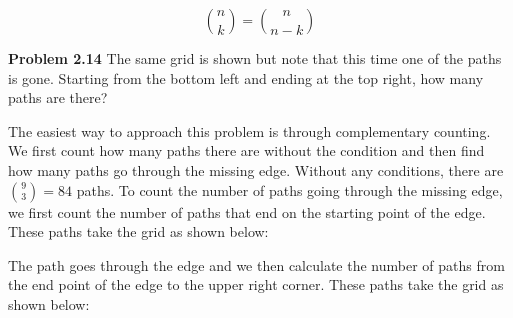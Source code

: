\documentclass[11pt]{scrartcl}
\begin{document}
$${n \choose k}={n \choose {n-k}}$$
\begin{tcolorbox}
\textbf{Problem 2.14} The same grid is shown but note that this time one of the paths is gone. Starting from the bottom left and ending at the top right, how many paths are there?
\vspace*{+0.25cm}

\centering 
{}
\end{tcolorbox}
\noindent 
The easiest way to approach this problem is through complementary counting. We first count how many paths there are without the condition and then find how many paths go through the missing edge. Without any conditions, there are ${9 \choose 3}=84$ paths. To count the number of paths going through the missing edge, we first count the number of paths that end on the starting point of the edge. These paths take the grid as shown below:
\vspace*{+0.25cm}

\begin{center}
{}
\end{center}
\noindent
The path goes through the edge and we then calculate the number of paths from the end point of the edge to the upper right corner. These paths take the grid as shown below: 
\vspace*{+0.25cm}
\end{document}
